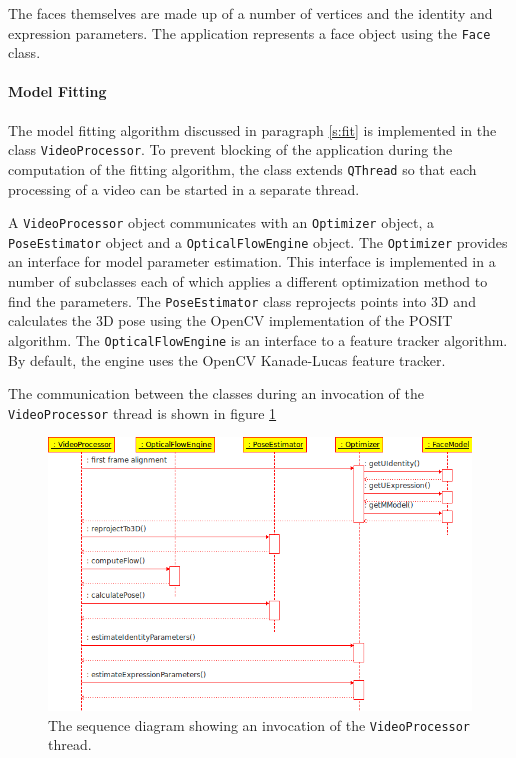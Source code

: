 \documentclass[11pt,a4paper]{report}
\begin{document}
The faces themselves are made up of a number of vertices and the identity and
expression parameters. The application represents a face object using the
\texttt{Face} class.
\paragraph{Model Fitting}
The model fitting algorithm discussed in paragraph \ref{s:fit} is implemented in
the class \texttt{VideoProcessor}. To prevent blocking of the application during the
computation of the fitting algorithm, the class extends \texttt{QThread} so that
each processing of a video can be started in a separate thread.

A \texttt{VideoProcessor} object communicates with an \texttt{Optimizer} object,
a \texttt{PoseEstimator} object and a \texttt{OpticalFlowEngine} object. The
\texttt{Optimizer} provides an interface for model parameter estimation. This
interface is implemented in a number of subclasses each of which applies a
different optimization method to find the parameters. The \texttt{PoseEstimator}
class reprojects points into 3D and calculates the 3D pose using the OpenCV
implementation of the POSIT algorithm. The \texttt{OpticalFlowEngine} is an
interface to a feature tracker algorithm. By default, the engine uses the OpenCV
Kanade-Lucas feature tracker.

The communication between the classes during an invocation of the
\texttt{VideoProcessor} thread is shown in figure \ref{fg:videoproc}

\begin{figure}[H]
\begin{centering}
\includegraphics[scale=0.71]{images/videoproc.png}
\par\end{centering}

\caption{The sequence diagram showing an invocation of the
  \texttt{VideoProcessor} thread.}
\label{fg:videoproc}
\end{figure}
\end{document}
